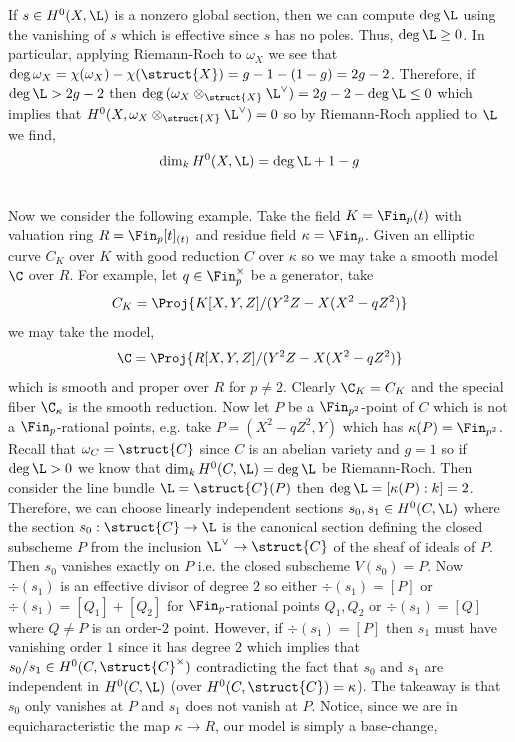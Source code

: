 \begin{rmk}
If $s \in H^0(X, \L)$ is a nonzero global section, then we can compute $\deg{\L}$ using the vanishing of $s$ which is effective since $s$ has no poles. Thus, $\deg{\L} \ge 0$. In particular, applying Riemann-Roch to $\omega_X$ we see that $\deg{\omega_X} = \chi(\omega_X) - \chi(\struct{X}) = g - 1 - (1 - g) = 2 g - 2$. Therefore, if $\deg{\L} > 2 g - 2$ then $\deg{(\omega_X \otimes_{\struct{X}} \L^\vee)} = 2 g - 2 - \deg{\L} \le 0$ which implies that $H^0(X, \omega_X \otimes_{\struct{X}} \L^\vee) = 0$ so by Riemann-Roch applied to $\L$ we find,
\[ \dim_k H^0(X, \L) = \deg{\L} + 1 - g \]
\end{rmk}
\noindent\\
Now we consider the following example. Take the field $K = \Fin_p(t)$ with valuation ring $R = \Fin_p[t]_{(t)}$ and residue field $\kappa = \Fin_p$. Given an elliptic curve $C_K$ over $K$ with good reduction $C$ over $\kappa$ so we may take a smooth model $\C$ over $R$. For example, let $q \in \Fin_p^\times$ be a generator, take 
\[ C_K = \Proj{K[X, Y, Z]/(Y^2 Z - X(X^2 - q Z^2)} \] 
we may take the model,
\[ \C = \Proj{R[X, Y, Z]/(Y^2 Z - X(X^2 - q Z^2)} \] 
which is smooth and proper over $R$ for $p \neq 2$. Clearly $\C_K = C_K$ and the special fiber $\C_\kappa$ is the smooth reduction. Now let $P$ be a $\Fin_{p^2}$-point of $C$ which is not a $\Fin_p$-rational points, e.g. take $P = (X^2 - q Z^2, Y)$ which has $\kappa(P) = \Fin_{p^2}$. Recall that $\omega_C = \struct{C}$ since $C$ is an abelian variety and $g = 1$ so if $\deg{\L} > 0$ we know that $\dim_k H^0(C, \L) = \deg{\L}$ be Riemann-Roch. Then consider the line bundle $\L = \struct{C}(P)$ then $\deg{\L} = [\kappa(P) : k]  = 2$. Therefore, we can choose linearly independent sections $s_0, s_1 \in H^0(C, \L)$ where the section $s_0 : \struct{C} \to \L$ is the canonical section defining the closed subscheme $P$ from the inclusion $\L^\vee \to \struct{C}$ of the sheaf of ideals of $P$. Then $s_0$ vanishes exactly on $P$ i.e. the closed subscheme $V(s_0) = P$. Now $\div{(s_1)}$ is an effective divisor of degree $2$ so either $\div{(s_1)} = [P]$ or $\div{(s_1)} = [Q_1] + [Q_2]$ for $\Fin_p$-rational points $Q_1, Q_2$ or $\div{(s_1)} = [Q]$ where $Q \neq P$ is an order-$2$ point. However, if $\div{(s_1)} = [P]$ then $s_1$ must have vanishing order $1$ since it has degree $2$ which implies that $s_0 / s_1 \in H^0(C, \struct{C}^\times)$ contradicting the fact that $s_0$ and $s_1$ are independent in $H^0(C, \L)$ (over $H^0(C, \struct{C}) = \kappa$). The takeaway is that $s_0$ only vanishes at $P$ and $s_1$ does not vanish at $P$. Notice, since we are in equicharacteristic the map $\kappa \to R$, our model is simply a base-change,
